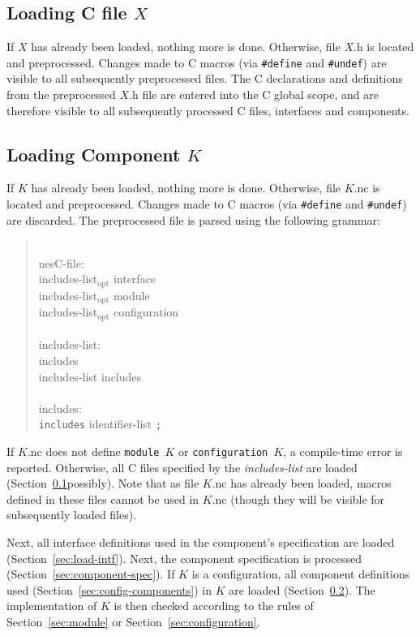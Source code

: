\documentclass[11pt,letterpaper]{article}
\newcommand{\kw}[1]{{\tt #1}}
\newcommand{\code}[1]{{\tt #1}}
\newcommand{\opt}{$_{\mbox{opt}}$\xspace}
\newcommand{\grammarshift}{\vspace*{-.7cm}}
\newcommand{\grammarindent}{\hspace*{2cm}\= \\ \kill}
\begin{document}
\subsection{Loading C file $X$}
\label{sec:load-c}

If $X$ has already been loaded, nothing more is done. Otherwise, file $X$.h
is located and preprocessed. Changes made to C macros (via \code{\#define}
and \code{\#undef}) are visible to all subsequently preprocessed files. The C
declarations and definitions from the preprocessed $X$.h file are entered
into the C global scope, and are therefore visible to all subsequently
processed C files, interfaces and components.

\subsection{Loading Component $K$}
\label{sec:load-component}

If $K$ has already been loaded, nothing more is done. Otherwise, file
$K$.nc is located and preprocessed. Changes made to C macros (via
\code{\#define} and \code{\#undef}) are discarded. The preprocessed file is
parsed using the following grammar: \begin{quote} \grammarshift \em \begin{tabbing}
\grammarindent
nesC-file: \\
\>	includes-list\opt interface\\
\>	includes-list\opt module\\
\>	includes-list\opt configuration\\
\\
includes-list:\\
\>	includes\\
\>	includes-list includes\\
\\
includes:\\
\>	\kw{includes} identifier-list \kw{;}\\
\end{tabbing} \end{quote}
If $K$.nc does not define \code{module $K$} or \code{configuration $K$}, a
compile-time error is reported. Otherwise, all C files specified by the
\emph{includes-list} are loaded (Section~\ref{sec:load-c}possibly). Note that
as file $K$.nc has already been loaded, macros defined in these files cannot
be used in $K$.nc (though they will be visible for subsequently loaded files).

Next, all interface definitions used in the component's specification are
loaded (Section~\ref{sec:load-intf}). Next, the component specification is
processed (Section~\ref{sec:component-spec}). If $K$ is a configuration, all
component definitions used (Section~\ref{sec:config-components}) in $K$ are
loaded (Section~\ref{sec:load-component}). The implementation of $K$ is
then checked according to the rules of Section~\ref{sec:module} or
Section~\ref{sec:configuration}.
\end{document}
